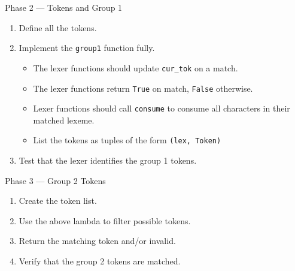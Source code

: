 \documentclass[handout]{beamer}
\newenvironment{code}{%
 \VerbatimEnvironment
 \begin{adjustbox}{max width=\textwidth, max height=0.7\textheight}
 \begin{BVerbatim}
  }{
  \end{BVerbatim}
 \end{adjustbox}
}
\begin{document}
\begin{frame}{Phase 2 --- Tokens and Group 1}
    \begin{enumerate}
        \item Define all the tokens.
        \item Implement the \texttt{group1} function fully.
        \begin{itemize}
            \item The lexer functions should update \texttt{cur\_tok} on a match.
            \item The lexer functions return \texttt{True} on match, \texttt{False} otherwise.
            \item Lexer functions should call \texttt{consume} to consume all characters in their matched lexeme.
            \item List the tokens as tuples of the form \texttt{(lex, Token)}
        \end{itemize}
        \item Test that the lexer identifies the group 1 tokens.
    \end{enumerate}
\end{frame}

\begin{frame}[fragile]{Phase 3 --- Group 2 Tokens}
    \begin{enumerate}
        \item Create the token list.
        \item Use the above lambda to filter possible tokens.
        \item Return the matching token and/or invalid.
        \item Verify that the group 2 tokens are matched.
    \end{enumerate}
\end{frame}
\end{document}
